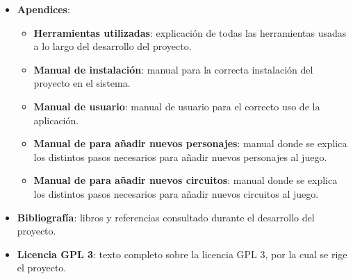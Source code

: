 \begin{itemize}
    \item \textbf{Apendices}: 
    \begin{itemize}
        \item \textbf{Herramientas utilizadas}: explicación de todas las herramientas usadas a lo largo del desarrollo del 
        proyecto.
        \item \textbf{Manual de instalación}: manual para la correcta instalación del proyecto en el sistema.
        \item \textbf{Manual de usuario}: manual de usuario para el correcto uso de la aplicación.
        \item \textbf{Manual de para añadir nuevos personajes}: manual donde se explica los distintos pasos necesarios para añadir
        nuevos personajes al juego.
        \item \textbf{Manual de para añadir nuevos circuitos}: manual donde se explica los distintos pasos necesarios para añadir
        nuevos circuitos al juego.
    \end{itemize}
    
    \item \textbf{Bibliografía}: libros y referencias consultado durante el desarrollo del proyecto.
    
    \item \textbf{Licencia GPL 3}: texto completo sobre la licencia GPL 3, por la cual se rige el proyecto.

\end{itemize}
